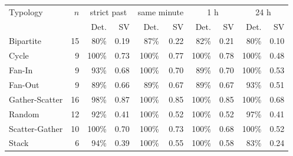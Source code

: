 \begin{tabular}{lrrrrrrrrr}
\toprule
Typology & $n$ & \multicolumn{2}{c}{strict past} & \multicolumn{2}{c}{same minute} & \multicolumn{2}{c}{1 h} & \multicolumn{2}{c}{24 h} \\
 & & Det. & SV & Det. & SV & Det. & SV & Det. & SV \\
\midrule
Bipartite & 15 & 80\% & 0.19 & 87\% & 0.22 & 82\% & 0.21 & 80\% & 0.10 \\
Cycle & 9 & 100\% & 0.73 & 100\% & 0.77 & 100\% & 0.78 & 100\% & 0.48 \\
Fan-In & 9 & 93\% & 0.68 & 100\% & 0.70 & 89\% & 0.70 & 100\% & 0.53 \\
Fan-Out & 9 & 89\% & 0.66 & 89\% & 0.67 & 89\% & 0.67 & 93\% & 0.51 \\
Gather-Scatter & 16 & 98\% & 0.87 & 100\% & 0.85 & 100\% & 0.85 & 100\% & 0.68 \\
Random & 12 & 92\% & 0.41 & 100\% & 0.52 & 100\% & 0.52 & 97\% & 0.41 \\
Scatter-Gather & 10 & 100\% & 0.70 & 100\% & 0.73 & 100\% & 0.68 & 100\% & 0.52 \\
Stack & 6 & 94\% & 0.39 & 100\% & 0.55 & 100\% & 0.58 & 83\% & 0.24 \\
\bottomrule
\end{tabular}